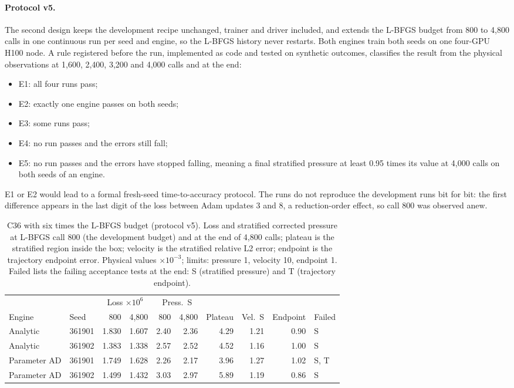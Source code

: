 \documentclass[11pt]{article}
\begin{document}
\paragraph{Protocol v5.}
The second design keeps the development recipe unchanged, trainer and driver
included, and extends the L-BFGS budget from 800 to 4,800 calls in one
continuous run per seed and engine, so the L-BFGS history never restarts.
Both engines train both seeds on one four-GPU H100 node. A rule registered
before the run, implemented as code and tested on synthetic outcomes,
classifies the result from the physical observations at 1,600, 2,400, 3,200
and 4,000 calls and at the end:
\begin{itemize}
\item E1: all four runs pass;
\item E2: exactly one engine passes on both seeds;
\item E3: some runs pass;
\item E4: no run passes and the errors still fall;
\item E5: no run passes and the errors have stopped falling, meaning a final
  stratified pressure at least 0.95 times its value at 4,000 calls on both
  seeds of an engine.
\end{itemize}
E1 or E2 would lead to a formal fresh-seed time-to-accuracy protocol. The
runs do not reproduce the development runs bit for bit: the first
difference appears in the last digit of the loss between Adam updates 3 and
8, a reduction-order effect, so call 800 was observed anew.

\begin{table}[htbp]\centering\small
\setlength{\tabcolsep}{4pt}
\caption{C36 with six times the L-BFGS budget (protocol v5). Loss and stratified corrected pressure at L-BFGS call 800 (the development budget) and at the end of 4,800 calls; plateau is the stratified region inside the box; velocity is the stratified relative L2 error; endpoint is the trajectory endpoint error. Physical values $\times10^{-3}$; limits: pressure 1, velocity 10, endpoint 1. Failed lists the failing acceptance tests at the end: S (stratified pressure) and T (trajectory endpoint).}
\label{tab:c36v5}
\begin{tabular}{llrrrrrrrl}\toprule
 & & \multicolumn{2}{c}{Loss $\times10^{6}$} & \multicolumn{2}{c}{Press.~S} & & & & \\\cmidrule(lr){3-4}\cmidrule(lr){5-6}
Engine & Seed & 800 & 4,800 & 800 & 4,800 & Plateau & Vel.~S & Endpoint & Failed\\\midrule
Analytic & 361901 & 1.830 & 1.607 & 2.40 & 2.36 & 4.29 & 1.21 & 0.90 & S\\
Analytic & 361902 & 1.383 & 1.338 & 2.57 & 2.52 & 4.52 & 1.16 & 1.00 & S\\
Parameter AD & 361901 & 1.749 & 1.628 & 2.26 & 2.17 & 3.96 & 1.27 & 1.02 & S, T\\
Parameter AD & 361902 & 1.499 & 1.432 & 3.03 & 2.97 & 5.89 & 1.19 & 0.86 & S
\\\bottomrule\end{tabular}
\end{table}
\end{document}
